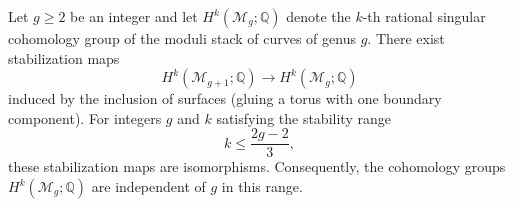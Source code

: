 \begin{theorem} \label{theorem:harer_stability_of_cohomology_of_moduli_spaces_of_curves}
  Let $g \geq 2$ be an integer and let $H^k(\mathcal{M}_g; \mathbb{Q})$ denote the $k$-th rational singular cohomology group of the moduli stack of curves of genus $g$. There exist stabilization maps
  $$ H^k(\mathcal{M}_{g+1}; \mathbb{Q}) \to H^k(\mathcal{M}_g; \mathbb{Q}) $$
  induced by the inclusion of surfaces (gluing a torus with one boundary component). For integers $g$ and $k$ satisfying the stability range
  $$ k \leq \frac{2g-2}{3}, $$
  these stabilization maps are isomorphisms. Consequently, the cohomology groups $H^k(\mathcal{M}_g; \mathbb{Q})$ are independent of $g$ in this range.
\end{theorem}
